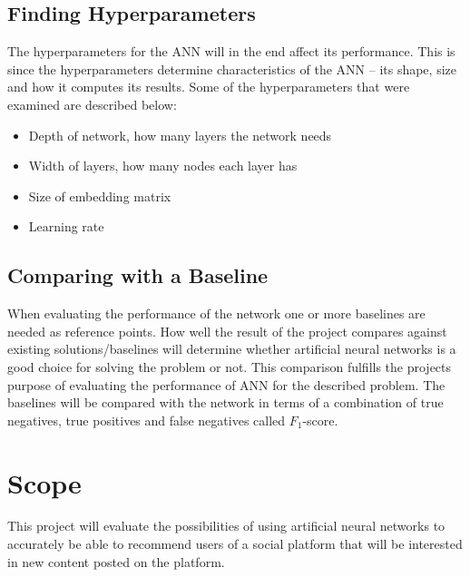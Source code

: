 \subsection{Finding Hyperparameters}
The hyperparameters for the ANN will in the end affect its performance. This is since the hyperparameters determine characteristics of the ANN -- its shape, size and how it computes its results. Some of the hyperparameters that were examined are described below:
\vspace*{0.25cm}
\begin{itemize}
    \item Depth of network, how many layers the network needs
    \item Width of layers, how many nodes each layer has
    \item Size of embedding matrix
    \item Learning rate
\end{itemize}

\subsection{Comparing with a Baseline}
When evaluating the performance of the network one or more baselines are needed as reference points. How well the result of the project compares against existing solutions/baselines will determine whether artificial neural networks is a good choice for solving the problem or not. This comparison fulfills the projects purpose of evaluating the performance of ANN for the described problem. The baselines will be compared with the network in terms of a combination of true negatives, true positives and false negatives called $F_1$-score.

\section{Scope}
This project will evaluate the possibilities of using artificial neural networks to accurately be able to recommend users of a social platform that will be interested in new content posted on the platform.


